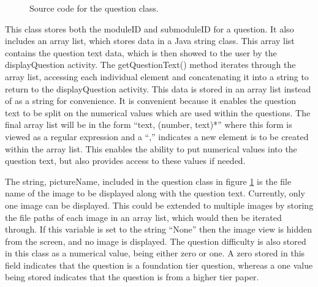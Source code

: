 \documentclass{article}
\begin{document}
\begin{figure}[H]
	\centering
	\caption{Source code for the question class.}
	\label{figure:questionClass}
\end{figure}

This class stores both the moduleID and submoduleID for a question. It also includes an array list, which stores data in a Java string class. This array list contains the question text data, which is then showed to the user by the displayQuestion activity. The getQuestionText() method iterates through the array list, accessing each individual element and concatenating it into a string to return to the displayQuestion activity. This data is stored in an array list instead of as a string for convenience. It is convenient because it enables the question text to be split on the numerical values which are used within the questions. The final array list will be in the form ``text, (number, text)*'' where this form is viewed as a regular expression and a ``,'' indicates a new element is to be created within the array list. This enables the ability to put numerical values into the question text, but also provides access to these values if needed. \par

The string, pictureName, included in the question class in figure \ref{figure:questionClass} is the file name of the image to be displayed along with the question text. Currently, only one image can be displayed. This could be extended to multiple images by storing the file paths of each image in an array list, which would then be iterated through. If this variable is set to the string ``None'' then the image view is hidden from the screen, and no image is displayed. The question difficulty is also stored in this class as a numerical value, being either zero or one. A zero stored in this field indicates that the question is a foundation tier question, whereas a one value being stored indicates that the question is from a higher tier paper. \par
\end{document}
